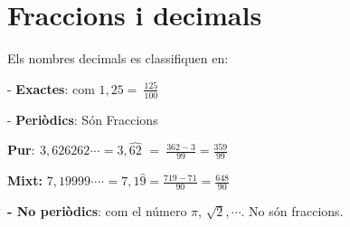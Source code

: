 \section{Fraccions i decimals}
 
\begin{theorybox}

Els nombres decimals es classifiquen en: 

- \textbf{Exactes}:  com $1,25=\ \frac{125}{100}$

- \textbf{Periòdics}:   Són Fraccions
	
	\quad\quad\quad \textbf{Pur}$\boldsymbol{:}\ 3,626262\textrm{·}\textrm{·}\textrm{·}=3,\widehat{62}$ $=\ \frac{362-3}{99}=\frac{359}{99}$               

	\quad\quad\quad \textbf{Mixt: }$7,19999\textrm{·}\textrm{·}\textrm{·}\textrm{·}=7,1\hat{9}=\frac{719-71}{90}=\frac{648}{90}$

\textbf{- No periòdics}: com el número $\pi$, $\sqrt{2}, \cdots$. No són fraccions.
\end{theorybox}




